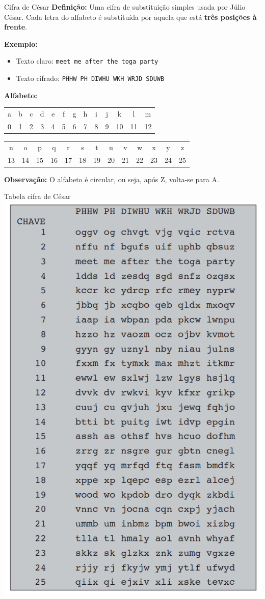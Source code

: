\begin{frame}{Cifra de César}
    \textbf{Definição:}
    Uma cifra de substituição simples usada por Júlio César. Cada letra do alfabeto é substituída por aquela que está \textbf{três posições à frente}.

    \medskip
    \textbf{Exemplo:}
    \begin{itemize}
        \item Texto claro: \texttt{meet me after the toga party}
        \item Texto cifrado: \texttt{PHHW PH DIWHU WKH WRJD SDUWB}
    \end{itemize}

    \textbf{Alfabeto:} \\
    \begin{tabular}{c c c c c c c c c c c c c}
        a & b & c & d & e & f & g & h & i & j & k  & l  & m  \\
        0 & 1 & 2 & 3 & 4 & 5 & 6 & 7 & 8 & 9 & 10 & 11 & 12
    \end{tabular}

    \begin{tabular}{c c c c c c c c c c c c c}
        n  & o  & p  & q  & r  & s  & t  & u  & v  & w  & x  & y  & z  \\
        13 & 14 & 15 & 16 & 17 & 18 & 19 & 20 & 21 & 22 & 23 & 24 & 25
    \end{tabular}

    \medskip
    \textbf{Observação:}
    O alfabeto é circular, ou seja, após Z, volta-se para A.
\end{frame}

\begin{frame}{Tabela cifra de César}
    \centering
    \includegraphics[width=0.35\linewidth]{Figuras/tabela-cifra-cesar.png}


\end{frame}

